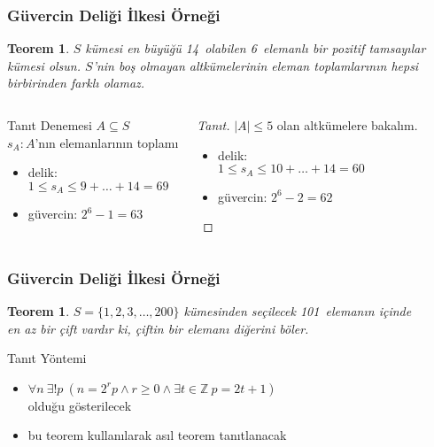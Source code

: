 \documentclass[dvipsnames]{beamer}
\theoremstyle{definition}
\theoremstyle{example}
\theoremstyle{plain}
\newtheorem{teorem}[theorem]{Teorem}
\begin{document}
\begin{frame}
  \frametitle{Güvercin Deliği İlkesi Örneği}

  \begin{teorem}
    $S$ kümesi en büyüğü 14~olabilen 6~elemanlı bir pozitif tamsayılar kümesi
    olsun. $S$'nin boş olmayan altkümelerinin eleman toplamlarının hepsi
    birbirinden farklı olamaz.
  \end{teorem}

  \pause
  \begin{columns}[t]
    \begin{block}{Tanıt Denemesi}
      $A \subseteq S$\\
      $s_A: A$'nın elemanlarının toplamı

      \pause
      \begin{itemize}
        \item delik:\\
          $1 \leq s_A \leq 9 + \dots + 14 = 69$
        \item güvercin: $2^6 - 1 = 63$
      \end{itemize}
    \end{block}

    \pause
    \begin{proof}[Tanıt]
      $|A| \leq 5$ olan altkümelere bakalım.

      \pause
      \begin{itemize}
        \item delik:\\
          $1 \leq s_A \leq 10 + \dots + 14 = 60$
        \item güvercin: $2^6 - 2 = 62$
      \end{itemize}
    \end{proof}
  \end{columns}
\end{frame}

\begin{frame}
  \frametitle{Güvercin Deliği İlkesi Örneği}

  \begin{teorem}
    $S = \{1,2,3,\dots,200\}$ kümesinden seçilecek 101~elemanın içinde\\
    en az bir çift vardır ki, çiftin bir elemanı diğerini böler.
  \end{teorem}

  \pause
  \begin{block}{Tanıt Yöntemi}
    \begin{itemize}
      \item $\forall n~\exists ! p~
        (n = 2^r p \wedge r \geq 0 \wedge \exists t \in \mathbb Z~p = 2t + 1)$\\
      olduğu gösterilecek

      \item bu teorem kullanılarak asıl teorem tanıtlanacak
    \end{itemize}
  \end{block}
\end{frame}
\end{document}
